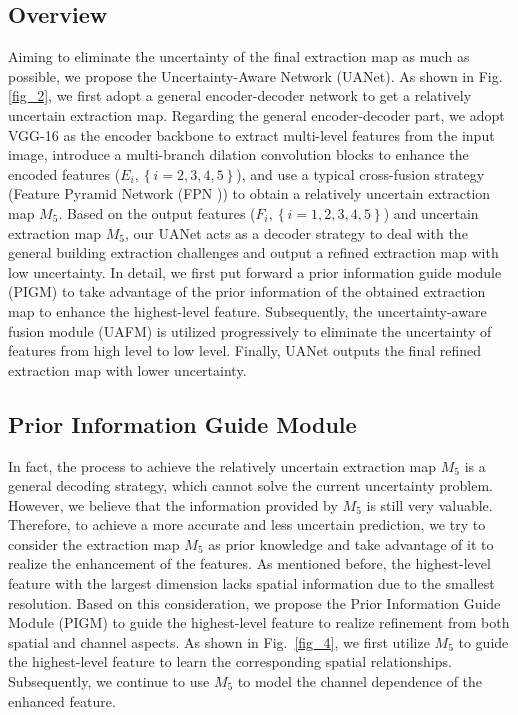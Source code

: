 \documentclass[lettersize,journal]{IEEEtran}
\begin{document}
\subsection{Overview}
Aiming to eliminate the uncertainty of the final extraction map as much as possible, we propose the Uncertainty-Aware Network (UANet). As shown in Fig.\ref{fig_2}, we first adopt a general encoder-decoder network to get a relatively uncertain extraction map. Regarding the general encoder-decoder part, we adopt VGG-16 \cite{VGG} as the encoder backbone to extract multi-level features from the input image, introduce a multi-branch dilation convolution blocks to enhance the encoded features ($E_{i}, \left\{i=2,3,4,5 \right \}$), and use a typical cross-fusion strategy (Feature Pyramid Network (FPN \cite{FPN})) to obtain a relatively uncertain extraction map $M_{5}$. Based on the output features ($F_{i}, \left\{i=1,2,3,4,5 \right \}$) and uncertain extraction map $M_{5}$, our UANet acts as a decoder strategy to deal with the general building extraction challenges and output a refined extraction map with low uncertainty.
In detail, we first put forward a prior information guide module (PIGM) to take advantage of the prior information of the obtained extraction map to enhance the highest-level feature. Subsequently, the uncertainty-aware fusion module (UAFM) is utilized progressively to eliminate the uncertainty of features from high level to low level. Finally, UANet outputs the final refined extraction map with lower uncertainty.

\subsection{Prior Information Guide Module}

In fact, the process to achieve the relatively uncertain extraction map $M_5$ is a general decoding strategy, which cannot solve the current uncertainty problem. However, we believe that the information provided by $M_5$ is still very valuable. Therefore, to achieve a more accurate and less uncertain prediction, we try to consider the extraction map $M_5$ as prior knowledge and take advantage of it to realize the enhancement of the features. As mentioned before, the highest-level feature with the largest dimension lacks spatial information due to the smallest resolution. Based on this consideration, we propose the Prior Information Guide Module (PIGM) to guide the highest-level feature to realize refinement from both spatial and channel aspects. As shown in Fig.~\ref{fig_4}, we first utilize $M_5$ to guide the highest-level feature to learn the corresponding spatial relationships. Subsequently, we continue to use $M_5$ to model the channel dependence of the enhanced feature.
\end{document}
